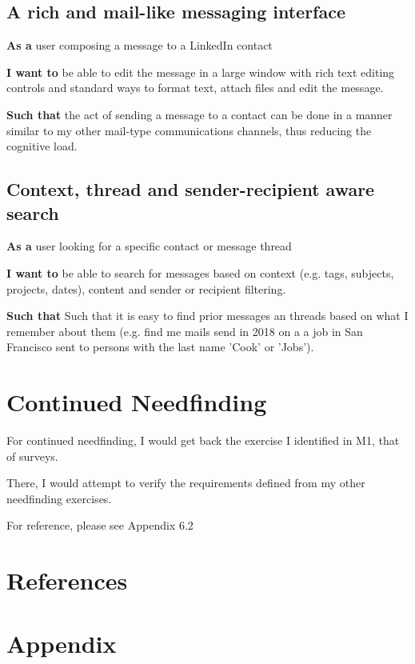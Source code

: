 \documentclass[
	letterpaper, %
]{jdf}
\begin{document}
\subsection{A rich and mail-like messaging interface}

\textbf{As a} user composing a message to a LinkedIn contact

\textbf{I want to} be able to edit the message in a large window with rich text editing controls and standard ways to format text, attach files and edit the message.

\textbf{Such that} the act of sending a message to a contact can be done in a manner similar to my other mail-type communications channels, thus reducing the cognitive load.

\subsection{Context, thread and sender-recipient aware search}

\textbf{As a} user looking for a specific contact or message thread

\textbf{I want to} be able to search for messages based on context (e.g. tags, subjects, projects, dates), content and sender or recipient filtering.

\textbf{Such that} Such that it is easy to find prior messages an threads based on what I remember about them (e.g. find me mails send in 2018 on a a job in San Francisco sent to persons with the last name 'Cook' or 'Jobs').

\section{Continued Needfinding}
For continued needfinding, I would get back the exercise I identified in M1, that of surveys.

There, I would attempt to verify the requirements defined from my other needfinding exercises.

For reference, please see Appendix 6.2

\section{References}

\printbibliography[heading=none]

\section{Appendix}
\end{document}
